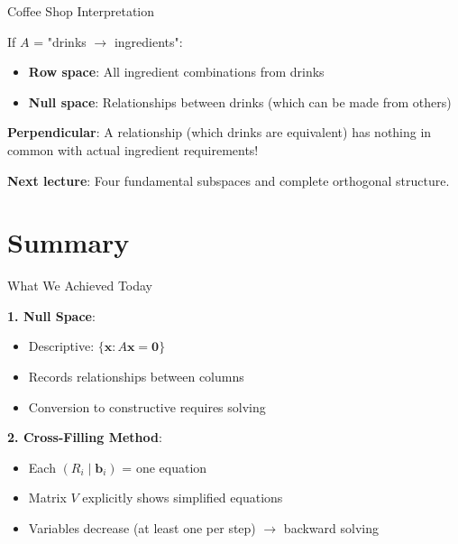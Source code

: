 \documentclass[10pt]{beamer}
\theoremstyle{definition}
\newcommand{\x}[1]{\alert{\textbf{#1}}}
\begin{document}
\begin{frame}{Coffee Shop Interpretation}

If $A$ = "drinks $\to$ ingredients":

\begin{itemize}
\item \textbf{Row space}: All ingredient combinations from drinks
\item \textbf{Null space}: Relationships between drinks (which can be made from others)
\end{itemize}

\vspace{1em}

\x{Perpendicular}: A relationship (which drinks are equivalent) has nothing in common with actual ingredient requirements!

\vspace{1em}

\x{Next lecture}: Four fundamental subspaces and complete orthogonal structure.

\end{frame}

\section{Summary}

\begin{frame}{What We Achieved Today}

\x{1. Null Space}:
\begin{itemize}
\item Descriptive: $\{\mathbf{x} : A\mathbf{x} = \mathbf{0}\}$
\item Records relationships between columns
\item Conversion to constructive requires solving
\end{itemize}

\vspace{0.5em}

\x{2. Cross-Filling Method}:
\begin{itemize}
\item Each $(R_i \mid \mathbf{b}_i)$ = one equation
\item Matrix $V$ explicitly shows simplified equations
\item Variables decrease (at least one per step) $\to$ backward solving
\end{itemize}

\end{frame}
\end{document}
